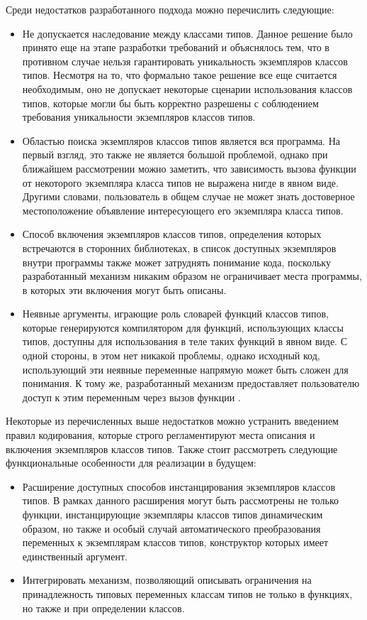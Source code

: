 Среди недостатков разработанного подхода можно перечислить следующие:
\begin{itemize}
    \item Не допускается наследование между классами типов. Данное решение было принято еще на этапе разработки требований и объяснялось тем, что в противном случае нельзя гарантировать уникальность экземпляров классов типов. Несмотря на то, что формально такое решение все еще считается необходимым, оно не допускает некоторые сценарии использования классов типов, которые могли бы быть корректно разрешены с соблюдением требования уникальности экземпляров классов типов.  
    \item Областью поиска экземпляров классов типов является вся программа. На первый взгляд, это также не является большой проблемой, однако при ближайшем рассмотрении можно заметить, что зависимость вызова функции от некоторого экземпляра класса типов не выражена нигде в явном виде. Другими словами, пользователь в общем случае не может знать достоверное местоположение объявление интересующего его экземпляра класса типов.  
    \item Способ включения экземпляров классов типов, определения которых встречаются в сторонних библиотеках, в список доступных экземпляров внутри программы также может затруднять понимание кода, поскольку разработанный механизм никаким образом не ограничивает места программы, в которых эти включения могут быть описаны. 
    \item Неявные аргументы, играющие роль словарей функций классов типов, которые генерируются компилятором для функций, использующих классы типов, доступны для использования в теле таких функций в явном виде. С одной стороны, в этом нет никакой проблемы, однако исходный код, использующий эти неявные переменные напрямую может быть сложен для понимания. К тому же, разработанный механизм предоставляет пользователю доступ к этим переменным через вызов функции . 
\end{itemize}
Некоторые из перечисленных выше недостатков можно устранить введением правил кодирования, которые строго регламентируют места описания и включения экземпляров классов типов. Также стоит рассмотреть следующие функциональные особенности для реализации в будущем:
\begin{itemize}
    \item Расширение доступных способов инстанцирования экземпляров классов типов. В рамках данного расширения могут быть рассмотрены не только функции, инстанцирующие экземпляры классов типов динамическим образом, но также и особый случай автоматического преобразования переменных к экземплярам классов типов, конструктор которых имеет единственный аргумент.  
    \item Интегрировать механизм, позволяющий описывать ограничения на принадлежность типовых переменных классам типов не только в функциях, но также и при определении классов.
\end{itemize}

